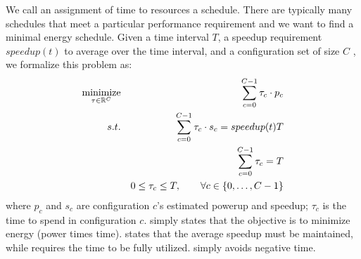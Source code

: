 We call an assignment of time to resources a schedule. There are
typically many schedules that meet a particular performance
requirement and we want to find a minimal energy schedule. Given a
time interval $T$, a speedup requirement $speedup(t)$ to average over
the time interval, and a configuration set of size $C$ , we formalize
this problem as:
\begin{eqnarray}
  \minimize_{\mathbf{\tau} \in \R^{C}} && \sum_{c=0}^{C-1} \tau_c \cdot p_c \label{eqn:power}  \\
  \st %
  && \sum_{c=0}^{C-1} \tau_c \cdot s_c =  speedup(t)T \label{eqn:work} \\
  && \sum_{c=0}^{C-1} \tau_c =  T \label{eqn:deadline} \\
  && 0 \le \tau_c \le T, \qquad \forall c \in \{0,\ldots,C-1\} \label{eqn:time}
\end{eqnarray}
where $p_c$ and $s_c$ are configuration $c$'s estimated powerup and
speedup; $\tau_c$ is the time to spend in configuration $c$.
 simply states that the objective is to minimize energy
(power times time).   states that the average speedup
must be maintained, while  requires the time to be
fully utilized.   simply avoids negative time.


